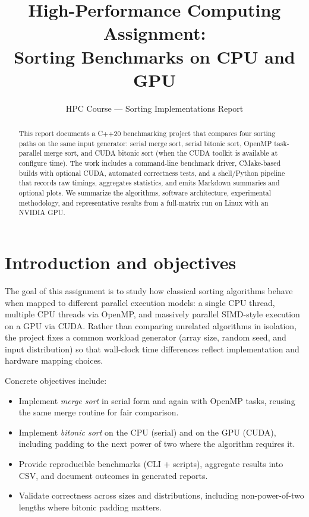 \documentclass[11pt,a4paper]{article}
\title{High-Performance Computing Assignment:\\
Sorting Benchmarks on CPU and GPU}
\author{HPC Course — Sorting Implementations Report}
\date{}
\begin{document}
\maketitle

\begin{abstract}
This report documents a C++20 benchmarking project that compares four sorting paths on the same input generator: serial merge sort, serial bitonic sort, OpenMP task-parallel merge sort, and CUDA bitonic sort (when the CUDA toolkit is available at configure time). The work includes a command-line benchmark driver, CMake-based builds with optional CUDA, automated correctness tests, and a shell/Python pipeline that records raw timings, aggregates statistics, and emits Markdown summaries and optional plots. We summarize the algorithms, software architecture, experimental methodology, and representative results from a full-matrix run on Linux with an NVIDIA GPU.
\end{abstract}

\tableofcontents
\newpage

\section{Introduction and objectives}

The goal of this assignment is to study how classical sorting algorithms behave when mapped to different parallel execution models: a single CPU thread, multiple CPU threads via OpenMP, and massively parallel SIMD-style execution on a GPU via CUDA. Rather than comparing unrelated algorithms in isolation, the project fixes a common workload generator (array size, random seed, and input distribution) so that wall-clock time differences reflect implementation and hardware mapping choices.

Concrete objectives include:
\begin{itemize}[noitemsep]
  \item Implement \emph{merge sort} in serial form and again with OpenMP tasks, reusing the same merge routine for fair comparison.
  \item Implement \emph{bitonic sort} on the CPU (serial) and on the GPU (CUDA), including padding to the next power of two where the algorithm requires it.
  \item Provide reproducible benchmarks (CLI + scripts), aggregate results into CSV, and document outcomes in generated reports.
  \item Validate correctness across sizes and distributions, including non-power-of-two lengths where bitonic padding matters.
\end{itemize}
\end{document}
